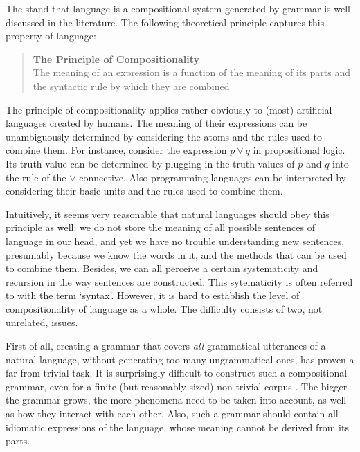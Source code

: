 \documentclass{report}
\theoremstyle{break}
\begin{document}
The stand that language is a compositional system generated by grammar is well discussed in the literature. The following theoretical principle captures this property of language:

\begin{quote}
\textbf{The Principle of Compositionality}\\
The meaning of an expression is a function of the meaning of its parts and the syntactic rule by which they are combined \citep{partee1984compositionality}
\end{quote}

The principle of compositionality applies rather obviously to (most) artificial languages created by humans. The meaning of their expressions can be unambiguously determined by considering the atoms and the rules used to combine them. For instance, consider the expression $p\lor q$ in propositional logic. Its truth-value can be determined by plugging in the truth values of $p$ and $q$ into the rule of the $\lor$-connective. Also programming languages can be interpreted by considering their basic units and the rules used to combine them.

Intuitively, it seems very reasonable that natural languages should obey this principle as well: we do not store the meaning of all possible sentences of language in our head, and yet we have no trouble understanding new sentences, presumably because we know the words in it, and the methods that can be used to combine them. Besides, we can all perceive a certain systematicity and recursion in the way sentences are constructed. This sytematicity is often referred to with the term `syntax'. However, it is hard to establish the level of compositionality of language as a whole. The difficulty consists of two, not unrelated, issues.

First of all, creating a grammar that covers \textit{all} grammatical utterances of a natural language, without generating too many ungrammatical ones, has proven a far from trivial task. It is surprisingly difficult to construct such a compositional grammar, even for a finite (but reasonably sized) non-trivial corpus \citep{scha1990taaltheorie}. The bigger the grammar grows, the more phenomena need to be taken into account, as well as how they interact with each other. Also, such a grammar should contain all idiomatic expressions of the language, whose meaning cannot be derived from its parts.
\end{document}

